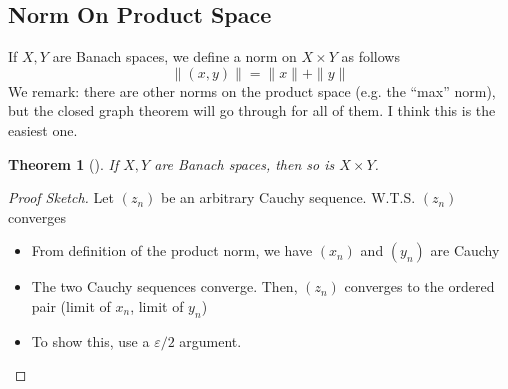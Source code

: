 \documentclass{article}
\theoremstyle{plain}
\newtheorem{thrm}{Theorem}
\theoremstyle{definition}
\begin{document}
		\subsection{Norm On Product Space}
		If $X,Y$ are Banach spaces, we define a norm on $X\times Y$ as follows 
		\begin{equation*}
				\|(x,y)\| = \|x\| + \|y\|
		\end{equation*}
		We remark: there are other norms on the product space (e.g. the ``max'' norm), but the closed graph theorem will go through for all of them. I think this is the easiest one. 
		\begin{thrm}[]
				If $X,Y$ are Banach spaces, then so is $X\times Y$. 
		\end{thrm}
		\begin{proof}[Proof Sketch]
				Let $(z_n)$ be an arbitrary Cauchy sequence. W.T.S. $(z_n)$ converges
				\begin{itemize}
						\item From definition of the product norm, we have $(x_n)$ and $(y_n)$ are Cauchy
						\item The two Cauchy sequences converge. Then, $(z_n)$ converges to the ordered pair (limit of $x_n$, limit of $y_n$) 
						\item To show this, use a $\varepsilon/2$ argument. 
				\end{itemize}
		\end{proof}
\end{document}
